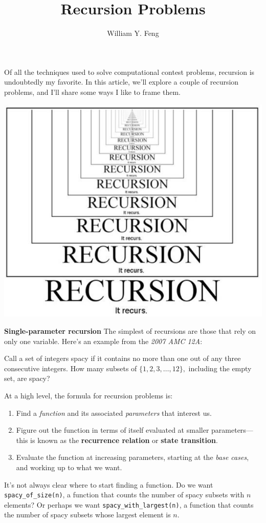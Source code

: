 \documentclass{article}
\title{Recursion Problems}
\author{William Y. Feng}
\begin{document}
\maketitle
Of all the techniques used to solve computational contest problems, recursion is undoubtedly my favorite. In this article, we'll explore a couple of recursion problems, and I'll share some ways I like to frame them.
\begin{center}
    \includegraphics[scale=0.6]{images/recursion.png}
\end{center}
\textbf{Single-parameter recursion}
The simplest of recursions are those that rely on only one variable. Here's an example from the \textit{2007 AMC 12A}:

Call a set of integers spacy if it contains no more than one out of any three consecutive integers. How many subsets of $\{1,2,3,\ldots,12\},$ including the empty set, are spacy?

At a high level, the formula for recursion problems is:
\begin{enumerate}
\item Find a \textit{function} and its associated \textit{parameters} that interest us.
\item Figure out the function in terms of itself evaluated at smaller parameters—this is known as the \textbf{recurrence relation} or \textbf{state transition}.
\item Evaluate the function at increasing parameters, starting at the \textit{base cases}, and working up to what we want.
\end{enumerate}
It's not always clear where to start finding a function. Do we want \texttt{spacy\_of\_size(n)}, a function that counts the number of spacy subsets with $n$ elements? Or perhaps we want \texttt{spacy\_with\_largest(n)}, a function that counts the number of spacy subsets whose largest element is $n$.
\end{document}
